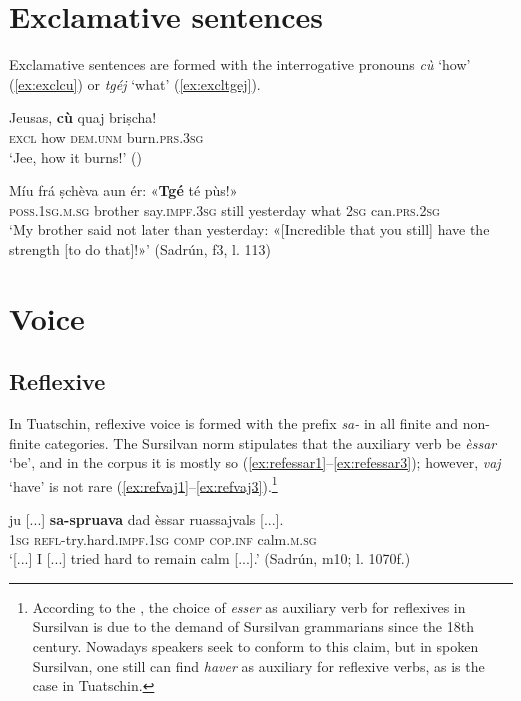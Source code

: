 \section{Exclamative sentences}
Exclamative sentences are formed with the interrogative pronouns \textit{cù} `how' (\ref{ex:exclcu}) or \textit{tgéj} `what' (\ref{ex:excltgej}).


\ea\label{ex:exclcu}
\gll Jeusas, \textbf{cù} quaj briṣcha!   \\
   \textsc{excl} how \textsc{dem.unm} burn.\textsc{prs.3sg}  \\
\glt `Jee, how it burns!' ()
\z

\ea
\label{ex:excltgej}
\gll Míu frá ṣchèva aun ér: «\textbf{Tgé} té pùs!»   \\
\textsc{poss.1sg.m.sg} brother say.\textsc{impf.3sg} still yesterday what \textsc{2sg} can.\textsc{prs.2sg} \\
\glt `My brother said not later than yesterday: «[Incredible that you still] have the strength [to do that]!»' (Sadrún, f3, l. 113)
\z

\section{Voice}

\subsection{Reflexive}

In Tuatschin, reflexive voice is formed with the prefix \textit{sa-} in all finite and non-finite categories. The Sursilvan norm stipulates that the auxiliary verb be \textit{èssar} `be', and in the corpus it is mostly so (\ref{ex:refessar1}--\ref{ex:refessar3}); however, \textit{vaj} `have' is not rare (\ref{ex:refvaj1}--\ref{ex:refvaj3}).\footnote{According to the , the choice of \textit{esser} as auxiliary verb for reflexives in Sursilvan is due to the demand of Sursilvan grammarians since the 18th century. Nowadays speakers seek to conform to this claim, but in spoken Sursilvan, one still can find \textit{haver} as auxiliary for reflexive verbs, as is the case in Tuatschin.}

\ea\label{ex:refessar1}
\gll [...] ju [...] \textbf{sa-spruava} dad èssar ruassajvals [...].\\
{} \textsc{1sg} {}  \textsc{refl-}try.hard.\textsc{impf.1sg} \textsc{comp} \textsc{cop.inf} calm.\textsc{m.sg}\\
\glt `[...] I [...] tried hard to remain calm [...].' (Sadrún, m10; l. 1070f.)
\z

